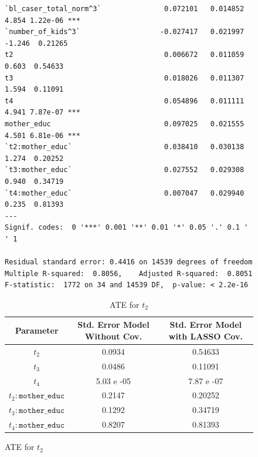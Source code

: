 \documentclass{article}
\begin{document}
\begin{figure}[H]
\begin{lstlisting}[style=RstyleComment, caption=CATE with Controls selected by LASSO]
`bl_caser_total_norm^3`               0.072101   0.014852   4.854 1.22e-06 ***
`number_of_kids^3`                   -0.027417   0.021997  -1.246  0.21265    
t2                                    0.006672   0.011059   0.603  0.54633    
t3                                    0.018026   0.011307   1.594  0.11091    
t4                                    0.054896   0.011111   4.941 7.87e-07 ***
mother_educ                           0.097025   0.021555   4.501 6.81e-06 ***
`t2:mother_educ`                      0.038410   0.030138   1.274  0.20252    
`t3:mother_educ`                      0.027552   0.029308   0.940  0.34719    
`t4:mother_educ`                      0.007047   0.029940   0.235  0.81393    
---
Signif. codes:  0 '***' 0.001 '**' 0.01 '*' 0.05 '.' 0.1 ' ' 1

Residual standard error: 0.4416 on 14539 degrees of freedom
Multiple R-squared:  0.8056,	Adjusted R-squared:  0.8051 
F-statistic:  1772 on 34 and 14539 DF,  p-value: < 2.2e-16
\end{lstlisting}
\end{figure}

\begin{figure}[H]
  \begin{table}[H]
  \centering
  \begin{tabular}{|c|cc|}
    \hline
    Parameter & Std. Error Model Without Cov. & Std. Error Model with LASSO Cov. \\
    \hline
    $t_2$                       & 0.0934       & 0.54633    \\
    $t_3$                       & 0.0486       & 0.11091    \\
    $t_4$                       & 5.03 e -05   & 7.87 e -07 \\
    $t_2 : \texttt{mother\_educ}$ & 0.2147      & 0.20252    \\
    $t_3 : \texttt{mother\_educ}$ & 0.1292      & 0.34719    \\
    $t_4 : \texttt{mother\_educ}$ & 0.8207      & 0.81393    \\
    \hline
  \end{tabular}
  \caption{ATE for $t_2$}
\end{table}
\end{figure}
\end{document}
